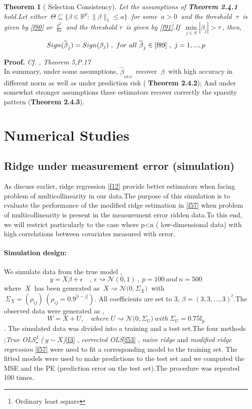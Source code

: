 \documentclass[12pt]{report}
\newtheorem{theoreme}{Theorem}[section] %
\begin{document}
\begin{theoreme}[ Selection Consistency]
	Let the assumptions of \textbf{Theorem 2.4.1} hold.Let either $\ \Theta\subseteq \big\{\beta \in \mathbb{R}^{p}: \parallel \beta \parallel_{1}\leq a\big\}\ $ for some $\ a>0\ $ and the threshold $\ \tau\ $ is given by \eqref{f90} or $\ \frac{\phi^{2}}{8s}\ $ and the threshold $\tau\ $ is given by \eqref{f91}.If $\ \underset{j\in S}{\min}|\beta_{j}|>\tau\ $, then,
	\begin{equation}
		Sign(\overset{_{\thicksim}}{\beta}_{j})=Sign(\beta_{j})\ ,\ for\ all\ \overset{_{\thicksim}}{\beta}_{j}\in \eqref{f89}\ ,\ j=1,...,p
	\end{equation}
\end{theoreme}
\textbf{Proof.} \textit{Cf. \cite{nref23}, Theorem 5,P.17}\\
In summary, under some assumptions, $ \hat{\beta}_{_{MUS}}\ $ recover $\ \beta\ $ with high accuracy in different norm  as well as under prediction risk ( \textbf{Theorem 2.4.2}); And under somewhat stronger assumptions these estimators recover correctly the sparsity pattern (\textbf{Theorem 2.4.3}).
\section{Numerical Studies}
\subsection{Ridge under measurement error (simulation) }
As discuss earlier, ridge regression \eqref{f12} provide better estimators when facing problem of multicollinearity in our data.The purpose of this simulation is to evaluate the performance of the modified ridge estimation in \eqref{f57} when problem of multicollinearity is present in the measurement error ridden data.To this end, we will restrict particularly to the case where p<n ( low-dimensional data) with high correlations between covariates measured with error.
\paragraph{Simulation design:}
We simulate data from the true model ,
$$y=X\beta +\epsilon \quad ,\ \epsilon \rightsquigarrow \mathcal{N}(0,1)\ ,\ p=100\ and\ n=500$$
where $\ X\ $ has been generated as $\ X\rightsquigarrow \mathcal{N}\big(0,\Sigma_{X} \big)\ $ with $\ \Sigma_{X}=(\rho_{ij})\  (\rho_{ij}=0.9^{|i-j|})$. All coefficients are set to 3, $\beta=(3,3,\dots,3)^{t}$.The observed data were generated as ,
$$W=X+U,\quad where\ U\rightsquigarrow \mathcal{N}\big(0,\Sigma_{U} \big)\ with\ \Sigma_{U}=0.75\mathbb{I}_{p}$$.
The simulated data was divided into a training and a test set.The four methods ;\textit{True OLS\footnote{Ordinary least square} ($\ y\sim X$)}\eqref{f3} , \textit{corrected OLS}\eqref{f53} , \textit{naive ridge} and \textit{modified ridge regression} \eqref{f57} were used to fit a corresponding model to the  training set. The fitted models were used to make predictions to the test set and we computed the MSE and the PE (prediction error on the test set).The procedure was repeated 100 times.
\end{document}
